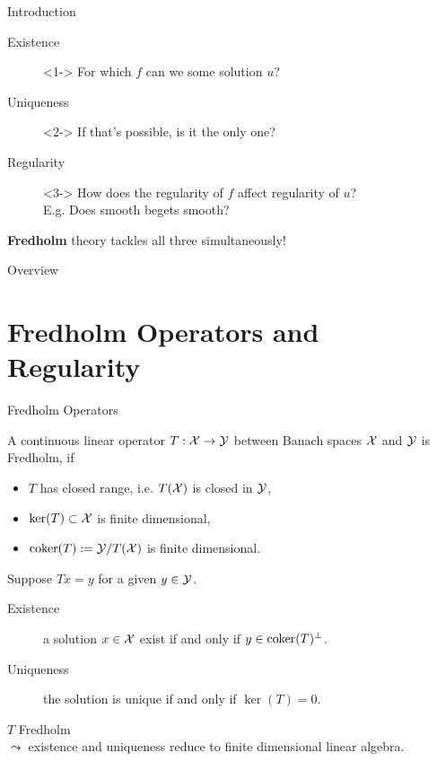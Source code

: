 \documentclass{beamer}
\begin{document}
\begin{frame}{Introduction}
\begin{description}
    \item[Existence]<1-> For which $f$ can we some solution $u$? 
    \item[Uniqueness ]<2->  If that's possible,  is it the only one? 
    \item[Regularity ]<3-> How does the regularity of $f$ affect regularity of $u$? \\
    E.g. Does smooth begets smooth? 
\end{description}

 \textbf{Fredholm} theory tackles all three simultaneously! 

\end{frame} 



\begin{frame}{Overview}
\tableofcontents
\end{frame}

\section{Fredholm Operators and Regularity} 


\begin{frame}{Fredholm Operators}
\begin{definition}
    A continuous linear operator $T : \mathcal{X} \to\mathcal{Y}$ between Banach spaces $\mathcal{X}$ and $\mathcal{Y}$ is Fredholm, if 
    \begin{itemize}
        \item $T$ has closed range, i.e. $T(\mathcal{X})$ is closed in $\mathcal{Y}$, 
        \item ${\mathrm{ker}}(T) \subset \mathcal{X} $ is finite dimensional, 
        \item ${\mathrm{coker}}(T) := \mathcal{Y} / T(\mathcal{X})$ is finite dimensional. 
    \end{itemize}
\end{definition}
\pause
Suppose $Tx = y$ for a given $y \in \mathcal{Y}$. 
\begin{description}
    \item[Existence] a solution $x \in \mathcal{X}$ exist if and only if  $y \in {\mathrm{coker}}(T)^\perp $. 
    \item[Uniqueness] the solution is unique if and only if $\ker(T) = 0$. 
\end{description}
\pause
$T$ Fredholm \\
$\leadsto$ existence and uniqueness reduce to finite dimensional linear algebra. 

\end{frame}
\end{document}
